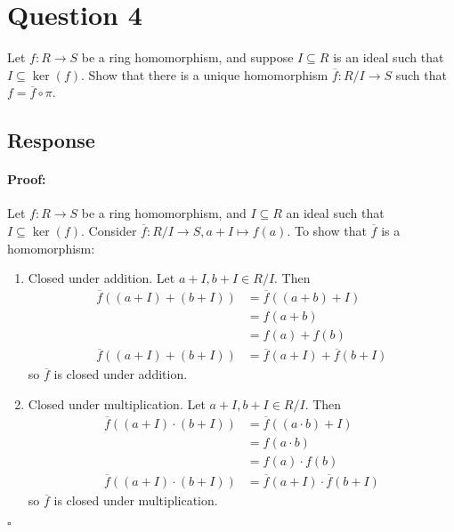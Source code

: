 \documentclass [12pt] {article}
\newenvironment{proof}{\paragraph{Proof:}}{\hfill$\square$}
\begin{document}
\section*{Question 4}
Let $f:R\to S$ be a ring homomorphism, and suppose $I\subseteq R$ is an ideal such that $I\subseteq \ker(f)$. Show that there is a unique homomorphism $\overline{f}:R/I\to S$ such that $f=\overline{f}\circ\pi$.
\subsection*{Response}
\begin{proof}
    Let $f : R \to S$ be a ring homomorphism, and $I \subseteq R$ an ideal such that 
    $I \subseteq \ker(f)$. Consider $\overline{f} : R/I \to S, a + I \mapsto f(a)$. To show that
    $\overline{f}$ is a homomorphism:
    \begin{enumerate}
        \item Closed under addition. Let $a + I, b + I \in R/I$. Then
            \begin{align*}
                \overline{f}((a + I) + (b + I)) 
                &= \overline{f}((a + b) + I)  \\
                &= f(a + b) \\
                &= f(a) + f(b) \\ 
                \overline{f}((a + I) + (b + I)) 
                &= \overline{f}(a + I) + \overline{f}(b + I)
            \end{align*}
            so $\overline{f}$ is closed under addition.
        \item Closed under multiplication. Let $a + I, b + I \in R/I$. Then
            \begin{align*}
                \overline{f}((a + I) \cdot (b + I)) 
                &= \overline{f}((a \cdot b) + I)  \\
                &= f(a \cdot b) \\
                &= f(a) \cdot f(b) \\ 
                \overline{f}((a + I) \cdot (b + I)) 
                &= \overline{f}(a + I) \cdot \overline{f}(b + I)
            \end{align*}
            so $\overline{f}$ is closed under multiplication.

\end{enumerate}
\end{proof}
\end{document}
